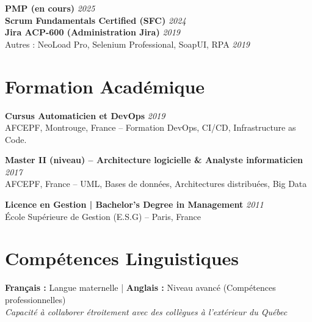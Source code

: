 \documentclass[11pt,a4paper]{article}
\begin{document}
\textbf{PMP (en cours)} \hfill \textit{\color{mediumgray}2025}\\
\textbf{Scrum Fundamentals Certified (SFC)} \hfill \textit{\color{mediumgray}2024}\\
\textbf{Jira ACP-600 (Administration Jira)} \hfill \textit{\color{mediumgray}2019}\\
Autres : NeoLoad Pro, Selenium Professional, SoapUI, RPA \hfill \textit{\color{mediumgray}2019}

\section*{Formation Académique}

\textbf{Cursus Automaticien et DevOps} \hfill \textit{\color{mediumgray}2019}\\
AFCEPF, Montrouge, France -- Formation DevOps, CI/CD, Infrastructure as Code. 

\textbf{Master II (niveau) -- Architecture logicielle \& Analyste informaticien} \hfill \textit{\color{mediumgray}2017}\\
AFCEPF, France -- UML, Bases de données, Architectures distribuées, Big Data

\textbf{Licence en Gestion | Bachelor's Degree in Management} \hfill \textit{\color{mediumgray}2011}\\
École Supérieure de Gestion (E.S.G) -- Paris, France

\vspace{6pt}

\section*{Compétences Linguistiques}

\textbf{Français :} Langue maternelle \quad | \quad \textbf{Anglais :} Niveau avancé (Compétences professionnelles)\\
\textit{Capacité à collaborer étroitement avec des collègues à l'extérieur du Québec}
\end{document}

